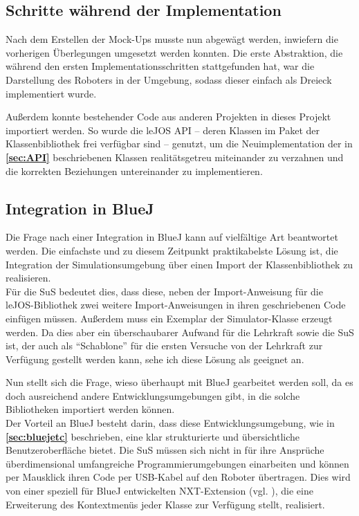 \documentclass[paper=a4, DIV=calc, BCOR=12mm, twoside=on, onecolumn=on, open = right, titlepage =on, parskip =half-, headsepline = on, footsepline = off, chapterprefix = off, appendixprefix = on, fontsize = 12pt, numbers = noenddot, abstract = on]{scrbook}
\begin{document}
\newpage
\par \singlespacing
\subsection{Schritte während der Implementation}
\onehalfspacing
Nach dem Erstellen der Mock-Ups musste nun abgewägt werden, inwiefern die vorherigen Überlegungen umgesetzt werden konnten. Die erste Abstraktion, die während den ersten Implementationsschritten stattgefunden hat, war die Darstellung des Roboters in der Umgebung, sodass dieser einfach als Dreieck implementiert wurde. 

Außerdem konnte bestehender Code aus anderen Projekten in dieses Projekt importiert werden. So wurde die leJOS API -- deren Klassen im Paket der Klassenbibliothek frei verfügbar sind -- genutzt, um die Neuimplementation der in \textbf{\ref{sec:API}} beschriebenen Klassen realitätsgetreu miteinander zu verzahnen und die korrekten Beziehungen untereinander zu implementieren.

\par \singlespacing
\subsection{Integration in BlueJ}
\label{sec:integration}
\onehalfspacing
Die Frage nach einer Integration in BlueJ kann auf vielfältige Art beantwortet werden. Die einfachste und zu diesem Zeitpunkt praktikabelste Lösung ist, die Integration der Simulationsumgebung über einen Import der Klassenbibliothek zu realisieren.\\
Für die SuS bedeutet dies, dass diese, neben der Import-Anweisung für die leJOS-Bibliothek zwei weitere Import-Anweisungen in ihren geschriebenen Code einfügen müssen. Außerdem muss ein Exemplar der Simulator-Klasse erzeugt werden. Da dies aber ein überschaubarer Aufwand für die Lehrkraft sowie die SuS ist, der auch als "`Schablone"' für die ersten Versuche von der Lehrkraft zur Verfügung gestellt werden kann, sehe ich diese Lösung als geeignet an.

Nun stellt sich die Frage, wieso überhaupt mit BlueJ gearbeitet werden soll, da es doch ausreichend andere Entwicklungsumgebungen gibt, in die solche Bibliotheken importiert werden können.\\
Der Vorteil an BlueJ besteht darin, dass diese Entwicklungsumgebung, wie in \textbf{\ref{sec:bluejetc}} beschrieben, eine klar strukturierte und übersichtliche Benutzeroberfläche bietet. Die SuS müssen sich nicht in für ihre Ansprüche überdimensional umfangreiche Programmierumgebungen einarbeiten und können per Mausklick ihren Code per USB-Kabel auf den Roboter übertragen. Dies wird von einer speziell für BlueJ entwickelten NXT-Extension  (vgl. \cite{bowes:12}), die eine Erweiterung des Kontextmenüs jeder Klasse zur Verfügung stellt, realisiert.
\end{document}
